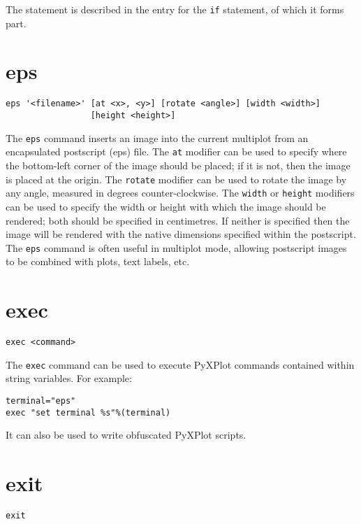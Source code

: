 The  statement is described in the entry for the {\tt if}
statement, of which it forms part.

\section{eps}

\begin{verbatim}
eps '<filename>' [at <x>, <y>] [rotate <angle>] [width <width>]
                 [height <height>]
\end{verbatim}

The {\tt eps} command inserts an image into the current multiplot from an
encapsulated postscript (eps) file.  The {\tt at} modifier can be used to
specify where the bottom-left corner of the image should be placed; if it is
not, then the image is placed at the origin. The {\tt rotate} modifier can be
used to rotate the image by any angle, measured in degrees counter-clockwise.
The {\tt width} or {\tt height} modifiers can be used to specify the width or
height with which the image should be rendered; both should be specified in
centimetres. If neither is specified then the image will be rendered with the
native dimensions specified within the postscript.  The {\tt eps} command is
often useful in multiplot mode, allowing postscript images to be combined with
plots, text labels, etc.

\section{exec}

\begin{verbatim}
exec <command>
\end{verbatim}

The {\tt exec} command can be used to execute PyXPlot commands contained within
string variables. For example:

\begin{verbatim}
terminal="eps"
exec "set terminal %s"%(terminal)
\end{verbatim}

It can also be used to write obfuscated PyXPlot scripts.

\section{exit}

\begin{verbatim}
exit
\end{verbatim}

